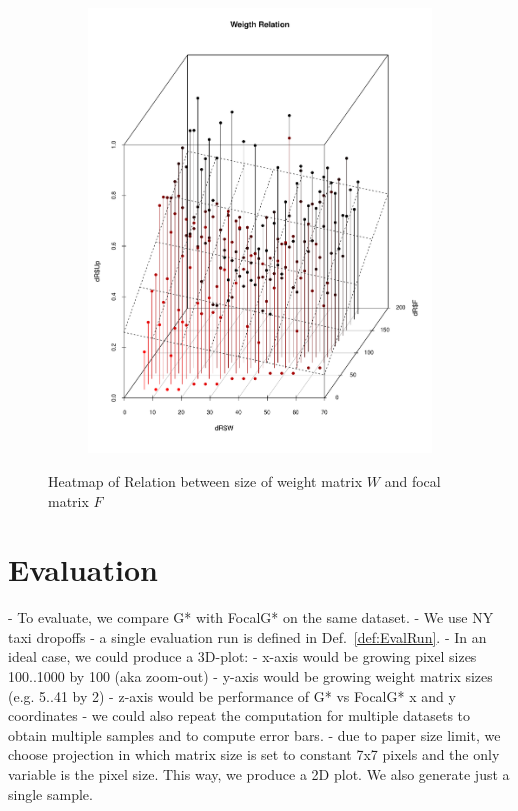 \documentclass{itatnew}
\begin{document}
\begin{figure}[htp]
\begin{subfigure}{\linewidth}
    \includegraphics[width=\linewidth]{images/WeightRelationUp}
    \label{fig:WeightRealtion}
  \end{subfigure}
  \caption{Heatmap of Relation between size of weight matrix $W$ and focal matrix $F$}
  \label{fig:RealtionUp}
\end{figure}

\section{Evaluation}

- To evaluate, we compare G* with FocalG* on the same dataset.
- We use NY taxi dropoffs
- a single evaluation run is defined in Def.~\ref{def:EvalRun}.
- In an ideal case, we could produce a 3D-plot:
  - x-axis would be growing pixel sizes 100..1000 by 100 (aka zoom-out)
  - y-axis would be growing weight matrix sizes (e.g. 5..41 by 2)
  - z-axis would be performance of G* vs FocalG* x and y coordinates
  - we could also repeat the computation for multiple datasets to obtain 
  multiple samples and to compute error bars.
- due to paper size limit, we choose projection in which matrix size is set to 
constant 7x7 pixels and the only variable is the pixel size. This way, we 
produce a 2D plot. We also generate just a single sample.
\end{document}
